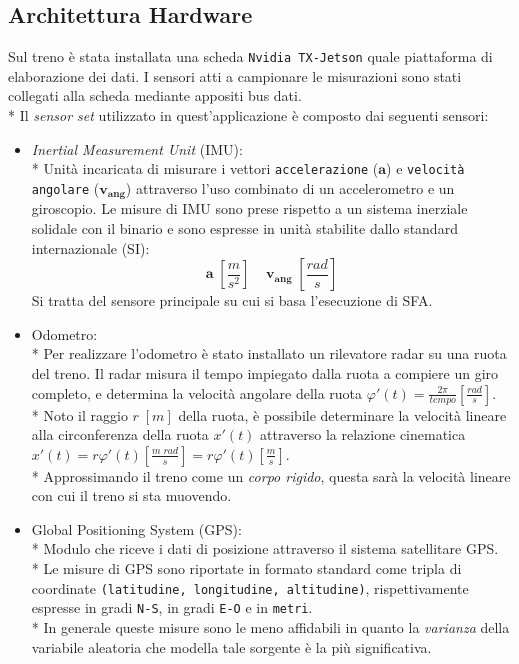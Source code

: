 \subsection{Architettura Hardware}
Sul treno \`e stata installata una scheda \texttt{Nvidia TX-Jetson} quale piattaforma di elaborazione dei dati. I sensori atti a campionare le misurazioni sono stati collegati alla scheda mediante appositi bus dati.\\*
Il \emph{sensor set} utilizzato in quest'applicazione \`e composto dai seguenti sensori:
\begin{itemize}
	\item \emph{Inertial Measurement Unit} (IMU):\\*
	Unit\`a incaricata di misurare i vettori \texttt{accelerazione} ($\mathbf{a}$) e \texttt{velocit\`a angolare} ($\mathbf{v_{ang}}$) attraverso l'uso combinato di un accelerometro e un giroscopio. Le misure di IMU sono prese rispetto a un sistema inerziale solidale con il binario e sono espresse in unit\`a stabilite dallo standard internazionale (SI):
	$$
	\mathbf{a}\;\left[\frac{m}{s^2}\right]\;\;\;\;\mathbf{v_{ang}}\;\left[ \frac{rad}{s} \right]
	$$Si tratta del sensore principale su cui si basa l'esecuzione di SFA.\newpage
	\item Odometro:\\*
	Per realizzare l'odometro \`e stato installato un rilevatore radar su una ruota del treno. Il radar misura il tempo impiegato dalla ruota a compiere un giro completo, e determina la velocit\`a angolare della ruota $\varphi'(t) = \frac{2\pi}{tempo} \left[ \frac{rad}{s}\right]$.\\*
	Noto il raggio $r\;[m]$ della ruota, \`e possibile determinare la velocit\`a lineare alla circonferenza della ruota  $x'(t)$ attraverso la relazione cinematica $x'(t) = r\varphi'(t) \left[ \frac{m\;rad}{s}\right] = r\varphi'(t) \left[ \frac{m}{s} \right]$.\\*
	Approssimando il treno come un \emph{corpo rigido}, questa sar\`a la velocit\`a lineare con cui il treno si sta muovendo.
	\item Global Positioning System (GPS):\\*
	Modulo che riceve i dati di posizione attraverso il sistema satellitare GPS.\\*
	Le misure di GPS sono riportate in formato standard come tripla di coordinate \texttt{(latitudine, longitudine, altitudine)}, rispettivamente espresse in gradi \texttt{N-S}, in gradi \texttt{E-O} e in \texttt{metri}.\\*
	In generale queste misure sono le meno affidabili in quanto la \emph{varianza} della variabile aleatoria che modella tale sorgente \`e la pi\`u significativa.
\end{itemize}
